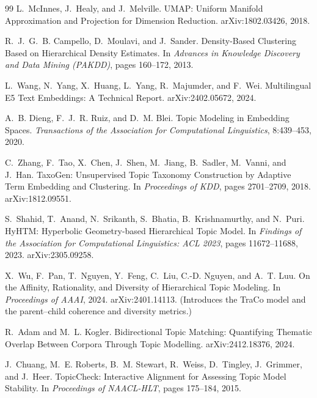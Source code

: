 \begin{thebibliography}{99}
L.~McInnes, J.~Healy, and J.~Melville.
\newblock UMAP: Uniform Manifold Approximation and Projection for Dimension Reduction.
\newblock arXiv:1802.03426, 2018.

R.~J.~G.~B. Campello, D.~Moulavi, and J.~Sander.
\newblock Density-Based Clustering Based on Hierarchical Density Estimates.
\newblock In \emph{Advances in Knowledge Discovery and Data Mining (PAKDD)}, pages 160--172, 2013.

L.~Wang, N.~Yang, X.~Huang, L.~Yang, R.~Majumder, and F.~Wei.
\newblock Multilingual E5 Text Embeddings: A Technical Report.
\newblock arXiv:2402.05672, 2024.

A.~B. Dieng, F.~J.~R. Ruiz, and D.~M. Blei.
\newblock Topic Modeling in Embedding Spaces.
\newblock \emph{Transactions of the Association for Computational Linguistics}, 8:439--453, 2020.

C.~Zhang, F.~Tao, X.~Chen, J.~Shen, M.~Jiang, B.~Sadler, M.~Vanni, and J.~Han.
\newblock TaxoGen: Unsupervised Topic Taxonomy Construction by Adaptive Term Embedding and
Clustering.
\newblock In \emph{Proceedings of KDD}, pages 2701--2709, 2018. arXiv:1812.09551.

S.~Shahid, T.~Anand, N.~Srikanth, S.~Bhatia, B.~Krishnamurthy, and N.~Puri.
\newblock HyHTM: Hyperbolic Geometry-based Hierarchical Topic Model.
\newblock In \emph{Findings of the Association for Computational Linguistics: ACL 2023},
pages 11672--11688, 2023. arXiv:2305.09258.

X.~Wu, F.~Pan, T.~Nguyen, Y.~Feng, C.~Liu, C.-D. Nguyen, and A.~T. Luu.
\newblock On the Affinity, Rationality, and Diversity of Hierarchical Topic Modeling.
\newblock In \emph{Proceedings of AAAI}, 2024. arXiv:2401.14113.
\newblock (Introduces the TraCo model and the parent--child coherence and diversity metrics.)

R.~Adam and M.~L. Kogler.
\newblock Bidirectional Topic Matching: Quantifying Thematic Overlap Between Corpora Through
Topic Modelling.
\newblock arXiv:2412.18376, 2024.

J.~Chuang, M.~E. Roberts, B.~M. Stewart, R.~Weiss, D.~Tingley, J.~Grimmer, and J.~Heer.
\newblock TopicCheck: Interactive Alignment for Assessing Topic Model Stability.
\newblock In \emph{Proceedings of NAACL-HLT}, pages 175--184, 2015.


\end{thebibliography}
